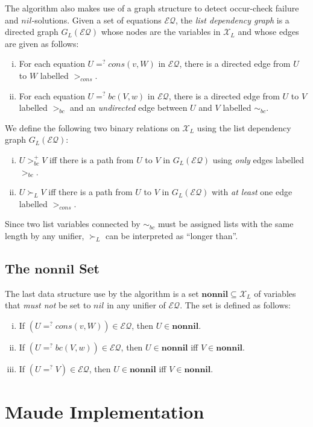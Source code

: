 \documentclass[11pt]{article}
\newcommand{\ueq}{=_{}^?}
\newcommand{\X}{\mathcal{X}}
\newcommand{\EQ}{\mathcal{EQ}}
\newcommand{\Bc}{\mathit{bc}}
\newcommand{\Cons}{\mathit{cons}}
\newcommand{\Nil}{\mathit{nil}}
\newcommand{\Nonnil}{\mathbf{nonnil}}
\begin{document}
The algorithm also makes use of a graph structure to detect occur-check failure
and $\Nil$-solutions. Given a set of equations $\EQ$, the \emph{list dependency
graph} is a directed graph $G_L(\EQ)$ whose nodes are the variables in $\X_L$ and
whose edges are given as follows:
\begin{enumerate}[(i)]
    \item For each equation $U \ueq \Cons(v, W)$ in $\EQ$, there is a directed
        edge from $U$ to $W$ labelled $>_{\Cons}$.
    \item For each equation $U \ueq \Bc(V, w)$ in $\EQ$, there is a directed
        edge from $U$ to $V$ labelled $>_{\Bc}$ and an \emph{undirected} edge
        between $U$ and $V$ labelled $\sim_{\Bc}$.
\end{enumerate}
We define the following two binary relations on $\X_L$ using the list dependency
graph $G_L(\EQ)$:
\begin{enumerate}[(i)]
    \item $U >_{\Bc}^+ V$ iff there is a path from $U$ to $V$ in $G_L(\EQ)$
        using \emph{only} edges labelled $>_{\Bc}$.

    \item $U \succ_L V$ iff there is a path from $U$ to $V$ in $G_L(\EQ)$ with
        \emph{at least} one edge labelled $>_{\Cons}$.
\end{enumerate}
Since two list variables connected by $\sim_{\Bc}$ must be assigned lists with
the same length by any unifier, $\succ_L$ can be interpreted as ``longer than''.

\subsection{The \texorpdfstring{$\Nonnil$}{nonnil} Set}
\label{subsection:nonnil}

The last data structure use by the algorithm is a set $\Nonnil \subseteq \X_L$
of variables that \emph{must not} be set to $\Nil$ in any unifier of $\EQ$. The
set is defined as follows:
\begin{enumerate}[(i)]
    \item If $(U \ueq \Cons(v, W)) \in \EQ$, then $U \in \Nonnil$.
    \item If $(U \ueq \Bc(V, w)) \in \EQ$, then $U \in \Nonnil$ iff $V \in \Nonnil$.
    \item If $(U \ueq V) \in \EQ$, then $U \in \Nonnil$ iff $V \in \Nonnil$.
\end{enumerate}

\section{Maude Implementation}\label{section:maude}
\end{document}
